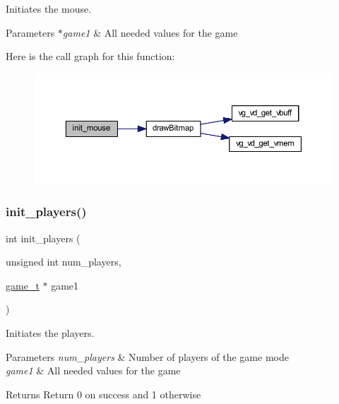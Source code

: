 Initiates the mouse. 


\begin{DoxyParams}{Parameters}
{\em $\ast$game1} & All needed values for the game \\
\hline
\end{DoxyParams}
Here is the call graph for this function\+:
\nopagebreak
\begin{figure}[H]
\begin{center}
\leavevmode
\includegraphics[width=350pt]{group___game_ga97a9584ff1d8b78ede18e32bf5a7bd50_cgraph}
\end{center}
\end{figure}
\hypertarget{group___game_ga1ebb9b5b5ce215ca81c1ca22526d935a}{}\label{group___game_ga1ebb9b5b5ce215ca81c1ca22526d935a} 
\subsubsection{\texorpdfstring{init\+\_\+players()}{init\_players()}}
{\footnotesize\ttfamily int init\+\_\+players (\begin{DoxyParamCaption}\item[{unsigned int}]{num\+\_\+players,  }\item[{\hyperlink{structgame__t}{game\+\_\+t} $\ast$}]{game1 }\end{DoxyParamCaption})}



Initiates the players. 


\begin{DoxyParams}{Parameters}
{\em num\+\_\+players} & Number of players of the game mode \\
\hline
{\em game1} & All needed values for the game \\
\hline
\end{DoxyParams}
\begin{DoxyReturn}{Returns}
Return 0 on success and 1 otherwise 
\end{DoxyReturn}


